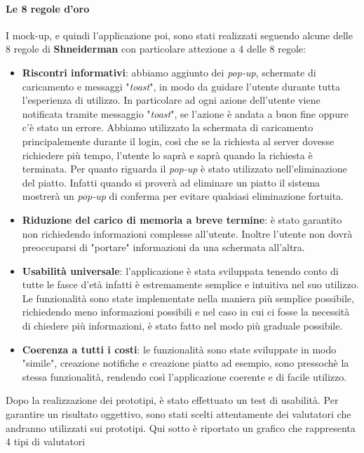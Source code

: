 \paragraph{Le 8 regole d'oro}
I mock-up, e quindi l'applicazione poi, sono stati realizzati seguendo alcune delle 8 regole di \textbf{Shneiderman} con particolare attezione a 4 delle 8 regole:
\begin{itemize}
  \item \textbf{Riscontri informativi}: abbiamo aggiunto dei \textit{pop-up}, schermate di caricamento e messaggi "\textit{toast}", in modo da guidare l'utente durante tutta l'esperienza di utilizzo.
        In particolare ad ogni azione dell'utente viene notificata tramite messaggio "\textit{toast}", se l'azione è andata a buon fine oppure c'è stato un errore. Abbiamo utilizzato la schermata di caricamento principalemente durante il login, così che se la richiesta al server dovesse richiedere più tempo, l'utente lo saprà e saprà quando la richiesta è terminata.
        Per quanto riguarda il \textit{pop-up} è stato utilizzato nell'eliminazione del piatto. Infatti quando si proverà ad eliminare un piatto il sistema mostrerà un \textit{pop-up} di conferma per evitare qualsiasi eliminazione fortuita.
  \item \textbf{Riduzione del carico di memoria a breve termine}: è stato garantito non richiedendo informazioni complesse all'utente. Inoltre l'utente non dovrà preoccuparsi di "portare" informazioni da una schermata all'altra.
  \item \textbf{Usabilità universale}: l'applicazione è stata sviluppata tenendo conto di tutte le fasce d'età infatti è estremamente semplice e intuitiva nel suo utilizzo. Le funzionalità sono state implementate nella maniera più semplice possibile, richiedendo meno informazioni possibili e nel caso in cui ci fosse la necessità di chiedere più informazioni, è stato fatto nel modo più graduale possibile.
  \item \textbf{Coerenza a tutti i costi}: le funzionalità sono state sviluppate in modo "simile", creazione notifiche e creazione piatto ad esempio, sono pressochè la stessa funzionalità, rendendo così l'applicazione coerente e di facile utilizzo.
\end{itemize}
\newpage
Dopo la realizzazione dei prototipi, è stato effettuato un test di usabilità. Per garantire un risultato oggettivo, sono stati scelti attentamente dei valutatori che andranno utilizzati sui prototipi.
Qui sotto è riportato un grafico che rappresenta 4 tipi di valutatori
